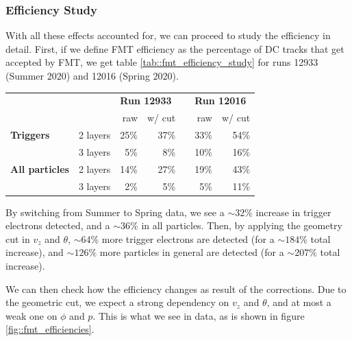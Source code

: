 \subsubsection{Efficiency Study}
    With all these effects accounted for, we can proceed to study the efficiency in detail.
    First, if we define FMT efficiency as the percentage of DC tracks that get accepted by FMT, we get table \ref{tab::fmt_efficiency_study} for runs 12933 (Summer 2020) and 12016 (Spring 2020).

    \begin{center}
        \begin{tabularx}{0.70\textwidth}{Xr|rrcrr}
            & & \multicolumn{2}{l}{\textbf{Run 12933}}        & & \multicolumn{2}{l}{\textbf{Run 12016}} \\
                                   &          & raw  & w/ cut & & raw  & w/ cut \\
            \hline
            \textbf{Triggers}      & 2 layers & 25\% & 37\%   & & 33\% & 54\%   \\
                                   & 3 layers &  5\% &  8\%   & & 10\% & 16\%   \\
            \hline
            \textbf{All particles} & 2 layers & 14\% & 27\%   & & 19\% & 43\%   \\
                                   & 3 layers &  2\% &  5\%   & &  5\% & 11\%
        \end{tabularx}
        \label{tab::fmt_efficiency_study}
    \end{center}

    By switching from Summer to Spring data, we see a $\sim32\%$ increase in trigger electrons detected, and a $\sim36\%$ in all particles.
    Then, by applying the geometry cut in $v_z$ and $\theta$, $\sim64\%$ more trigger electrons are detected (for a $\sim184\%$ total increase), and $\sim126\%$ more particles in general are detected (for a $\sim207\%$ total increase).

    We can then check how the efficiency changes as result of the corrections.
    Due to the geometric cut, we expect a strong dependency on $v_z$ and $\theta$, and at most a weak one on $\phi$ and $p$.
    This is what we see in data, as is shown in figure \ref{fig::fmt_efficiencies}.

